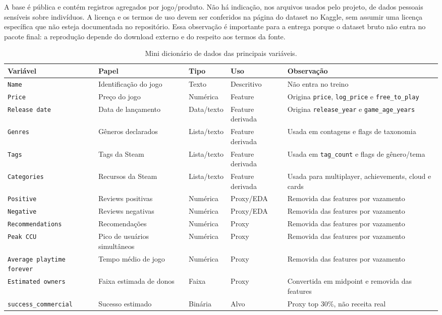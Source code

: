 \documentclass[12pt]{article}
\begin{document}
A base é pública e contém registros agregados por jogo/produto. Não há indicação, nos arquivos usados pelo projeto, de dados pessoais sensíveis sobre indivíduos. A licença e os termos de uso devem ser conferidos na página do dataset no Kaggle, sem assumir uma licença específica que não esteja documentada no repositório. Essa observação é importante para a entrega porque o dataset bruto não entra no pacote final: a reprodução depende do download externo e do respeito aos termos da fonte.

\begin{table}[ht]
\centering
\caption{Mini dicionário de dados das principais variáveis.}
\label{tab:dicionario}
\scriptsize
\begin{tabular}{p{}p{}p{}p{}p{}}
\toprule
Variável & Papel & Tipo & Uso & Observação \\
\midrule
\texttt{Name} & Identificação do jogo & Texto & Descritivo & Não entra no treino \\
\texttt{Price} & Preço do jogo & Numérica & Feature & Origina \texttt{price}, \texttt{log\_price} e \texttt{free\_to\_play} \\
\texttt{Release date} & Data de lançamento & Data/texto & Feature derivada & Origina \texttt{release\_year} e \texttt{game\_age\_years} \\
\texttt{Genres} & Gêneros declarados & Lista/texto & Feature derivada & Usada em contagens e flags de taxonomia \\
\texttt{Tags} & Tags da Steam & Lista/texto & Feature derivada & Usada em \texttt{tag\_count} e flags de gênero/tema \\
\texttt{Categories} & Recursos da Steam & Lista/texto & Feature derivada & Usada para multiplayer, achievements, cloud e cards \\
\texttt{Positive} & Reviews positivas & Numérica & Proxy/EDA & Removida das features por vazamento \\
\texttt{Negative} & Reviews negativas & Numérica & Proxy/EDA & Removida das features por vazamento \\
\texttt{Recommendations} & Recomendações & Numérica & Proxy & Removida das features por vazamento \\
\texttt{Peak CCU} & Pico de usuários simultâneos & Numérica & Proxy & Removida das features por vazamento \\
\texttt{Average playtime forever} & Tempo médio de jogo & Numérica & Proxy & Removida das features por vazamento \\
\texttt{Estimated owners} & Faixa estimada de donos & Faixa & Proxy & Convertida em midpoint e removida das features \\
\texttt{success\_commercial} & Sucesso estimado & Binária & Alvo & Proxy top 30\%, não receita real \\
\bottomrule
\end{tabular}
\end{table}
\end{document}
